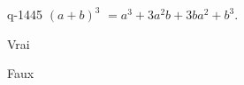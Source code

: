 \begin{truefalse}{q-1445}
$(a+b)^3$ $=a^3+3a^2b+3ba^2+b^3$.
\item Vrai
\item* Faux
\end{truefalse}

